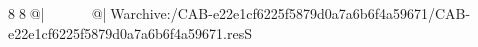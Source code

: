 8  8  @|                                                  @| W   archive:/CAB-e22e1cf6225f5879d0a7a6b6f4a59671/CAB-e22e1cf6225f5879d0a7a6b6f4a59671.resS 